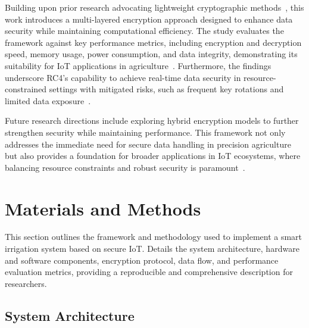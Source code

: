 \documentclass[journal]{Definitions/mdpi}
\begin{document}
Building upon prior research advocating lightweight cryptographic methods~\cite{ref-mdpi5, ref-journal6}, this work introduces a multi-layered encryption approach designed to enhance data security while maintaining computational efficiency. The study evaluates the framework against key performance metrics, including encryption and decryption speed, memory usage, power consumption, and data integrity, demonstrating its suitability for IoT applications in agriculture~\cite{ref-mdpi1}. Furthermore, the findings underscore RC4's capability to achieve real-time data security in resource-constrained settings with mitigated risks, such as frequent key rotations and limited data exposure~\cite{ref-journal2}.

Future research directions include exploring hybrid encryption models to further strengthen security while maintaining performance. This framework not only addresses the immediate need for secure data handling in precision agriculture but also provides a foundation for broader applications in IoT ecosystems, where balancing resource constraints and robust security is paramount~\cite{ref-mdpi3, ref-mdpi5}.


\section{Materials and Methods}

This section outlines the framework and methodology used to implement a  smart irrigation system based on secure IoT. Details the system architecture, hardware and software components, encryption protocol, data flow, and performance evaluation metrics, providing a reproducible and comprehensive description for researchers.

\subsection{System Architecture}
\end{document}
